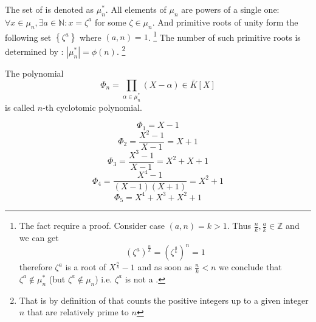 The set of  is denoted as
$\mu_n^*$. All elements of $\mu_n$ are powers of a single one:
$\forall x \in \mu_n, \exists a \in \mathbb{N}: x = \zeta^a$ for some
$\zeta \in \mu_n$. And primitive roots of unity form the following set
$\left\{\zeta^a\right\}$ where $\left(a, n\right) = 1$.
\label{sec:lec6_5_primitiveroot}
\footnote{
  The fact require a proof. Consider case $\left(a, n\right) = k >
  1$. Thus $\frac{n}{k}, \frac{a}{k} \in \mathbb{Z}$ and we can
  get 
  \[
  \left(\zeta^a\right)^{\frac{n}{k}} =
  \left(\zeta^{\frac{a}{k}}\right)^n = 1
  \]
  therefore $\zeta^a$ is a root of $X^{\frac{n}{k}} - 1$ and as soon
  as $\frac{n}{k} < n$ we conclude that $\zeta^a \notin \mu_n^\ast$
  (but $\zeta^a \notin \mu_n$) i.e. $\zeta^a$ is not a
  .
}
The number of
such primitive roots is determined by :
$\left|\mu_n^*\right| = \phi\left(n\right)$.
\footnote{
  That is by definition of  that counts the
  positive integers up to a given integer $n$ that are relatively
  prime to $n$  
}

\begin{definition}
  The polynomial
  \[
  \Phi_n = \prod_{\alpha \in \mu_n^*}\left(X - \alpha\right) \in \bar{K}\left[X\right]
  \]
  is called $n$-th cyclotomic polynomial.
  \label{def:cyclotomicpolynomial}
\end{definition}

\begin{example}
  \[
  \Phi_1 = X - 1
  \]
  \[
  \Phi_2 = \frac{X^2 - 1}{X-1} = X + 1
  \]
  \[
  \Phi_3 = \frac{X^3 - 1}{X-1} = X^2 + X + 1
  \]
  \[
  \Phi_4 = \frac{X^4 - 1}{\left(X-1\right)\left(X + 1\right)} = X^2 + 1
  \]
  \[
  \Phi_5 = X^4 + X^3 + X^2 + 1
  \]  
\end{example}

